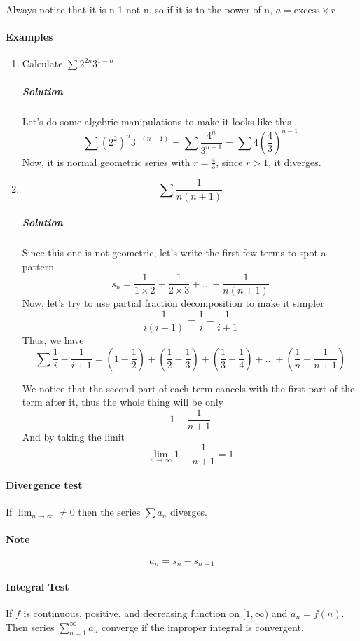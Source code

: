 \documentclass{article}
\begin{document}
Always notice that it is n-1 not n, so if it is to the power of n, $ a = \text{excess} \times r $ 
\paragraph{Examples}

\begin{enumerate}[1.]
\item 	Calculate $ \sum 2^{2n}3^{1-n}$ 
\subparagraph{Solution}
Let's do some algebric manipulations to make it looks like this
\[
	\sum (2^2)^n 3^{-(n-1)} = \sum \frac{ 4^n }{3^{n-1} } = \sum 4 \left(\frac{4}{3}\right)^{n-1}
\]
Now, it is normal geometric series with $r = \frac{4}{3}$, since $ r>1 $, it diverges.

\item $$\sum \frac{1}{n(n+1)}$$
\subparagraph{Solution} 
Since this one is not geometric, let's write the first few terms to spot a pattern
\[
	s_n=\frac{1}{1 \times 2} + \frac{1}{2 \times 3} + ... + \frac{1}{n(n+1)}
\]
Now, let's try to use partial fraction decomposition to make it simpler
\[
	\frac{1}{i(i+1)} = \frac{1}{i} - \frac{1}{i+1}
\]
		Thus, we have $$\sum \frac{1}{i} - \frac{1}{i+1} = (1-\frac{1}{2}) + (\frac{1}{2}-\frac{1}{3}) + (\frac{1}{3} - \frac{1}{4}) + ... + (\frac{1}{n} - \frac{1}{n+1})$$ 

		We notice that the second part of each term cancels with the first part of the term after it, thus the whole thing will be only
		\[
			1-\frac{1}{n+1}
		\]
		And by taking the limit
		\[
			\lim_{n \to \infty}1- \frac{1}{n+1} = 1
		\]
\end{enumerate}

\paragraph{Divergence test}
If $ \lim_{n \to \infty} \neq 0 $ then the series $ \sum a_n $ diverges.

\paragraph{Note} $$ a_n = s_n - s_{n-1}$$ 


\noindent\hrulefill 

\paragraph{Integral Test}
If $ f $ is continuous, positive, and decreasing function on $ [1,\infty) $ and $ a_n = f(n) $. Then series $ \sum_{n=1}^{\infty} a_n$ converge if the improper integral is convergent. 
\end{document}
